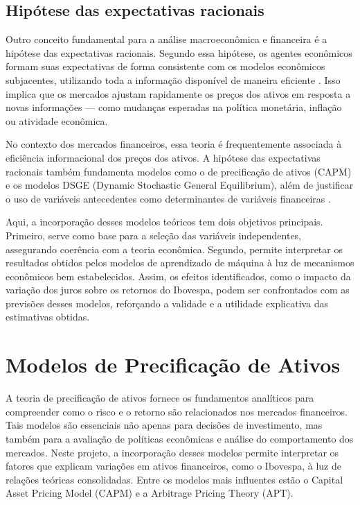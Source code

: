 \documentclass[	12pt, Times, openright, oneside, a4paper, english, brazil]{abntex2}
\begin{document}
\subsection{Hipótese das expectativas racionais}
Outro conceito fundamental para a análise macroeconômica e financeira é a hipótese das expectativas racionais. Segundo essa hipótese, os agentes econômicos formam suas expectativas de forma consistente com os modelos econômicos subjacentes, utilizando toda a informação disponível de maneira eficiente \cite{Davidson1982}. Isso implica que os mercados ajustam rapidamente os preços dos ativos em resposta a novas informações — como mudanças esperadas na política monetária, inflação ou atividade econômica.

No contexto dos mercados financeiros, essa teoria é frequentemente associada à eficiência informacional dos preços dos ativos. A hipótese das expectativas racionais também fundamenta modelos como o de precificação de ativos (CAPM) e os modelos DSGE (Dynamic Stochastic General Equilibrium), além de justificar o uso de variáveis antecedentes como determinantes de variáveis financeiras \cite{Dimson1998}.

Aqui, a incorporação desses modelos teóricos tem dois objetivos principais. Primeiro, serve como base para a seleção das variáveis independentes, assegurando coerência com a teoria econômica. Segundo, permite interpretar os resultados obtidos pelos modelos de aprendizado de máquina à luz de mecanismos econômicos bem estabelecidos. Assim, os efeitos identificados, como o impacto da variação dos juros sobre os retornos do Ibovespa, podem ser confrontados com as previsões desses modelos, reforçando a validade e a utilidade explicativa das estimativas obtidas.

\section{Modelos de Precificação de Ativos}

A teoria de precificação de ativos fornece os fundamentos analíticos para compreender como o risco e o retorno são relacionados nos mercados financeiros. Tais modelos são essenciais não apenas para decisões de investimento, mas também para a avaliação de políticas econômicas e análise do comportamento dos mercados. Neste projeto, a incorporação desses modelos permite interpretar os fatores que explicam variações em ativos financeiros, como o Ibovespa, à luz de relações teóricas consolidadas. Entre os modelos mais influentes estão o Capital Asset Pricing Model (CAPM) e a Arbitrage Pricing Theory (APT).
\end{document}
